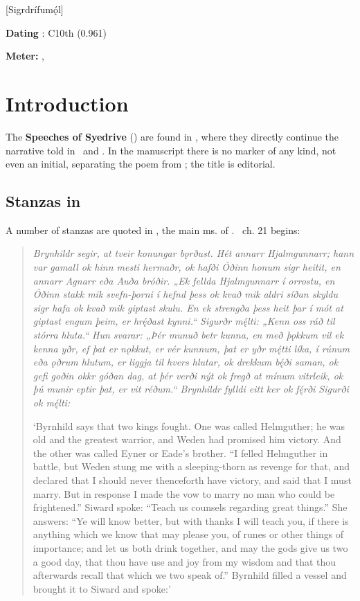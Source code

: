 [Sigrdrífumǫ́l]

\begin{flushright}%
\textbf{Dating} \parencite{Sapp2022}: C10th (0.961)

\textbf{Meter:} \Ljodahattr, \Fornyrdislag%
\end{flushright}

\section{Introduction}

The \textbf{Speeches of Syedrive} (\Sigrdrifumal) are found in \Regius, where they directly continue the narrative told in \Reginsmal\ and \Fafnismal.  In the manuscript there is no marker of any kind, not even an initial, separating the poem from \Fafnismal; the title is editorial.

\subsection{Stanzas in \VolsungaSaga}

A number of stanzas are quoted in \VolsungaMS, the main ms. of \VolsungaSaga.  \VolsungaSaga\ ch. 21 begins:

\begin{quote}
  \emph{Brynhildr segir, at tveir konungar bǫrðust. Hét annarr Hjalmgunnarr; hann var gamall ok hinn mesti hermaðr, ok hafði Óðinn honum sigr heitit, en annarr Agnarr eða Auða bróðir. „Ek fellda Hjalmgunnarr í orrostu, en Óðinn stakk mik svefn-þorni í hefnd þess ok kvað mik aldri síðan skyldu sigr hafa ok kvað mik giptast skulu. En ek strengða þess heit þar í mót at giptast engum þeim, er hrę́ðast kynni.“ Sigurðr mę́lti: „Kenn oss ráð til stórra hluta.“ Hun svarar: „Þér munuð betr kunna, en með þǫkkum vil ek kenna yðr, ef þat er nǫkkut, er vér kunnum, þat er yðr mę́tti líka, í rúnum eða ǫðrum hlutum, er liggja til hvers hlutar, ok drekkum bę́ði saman, ok gefi goðin okkr góðan dag, at þér verði nýt ok fregð at mínum vitrleik, ok þú munir eptir þat, er vit réðum.“ Brynhildr fylldi eitt ker ok fę́rði Sigurði ok mę́lti:}

  ‘Byrnhild says that two kings fought. One was called Helmguther; he was old and the greatest warrior, and Weden had promised him victory. And the other was called Eyner or Eade’s brother. “I felled Helmguther in battle, but Weden stung me with a sleeping-thorn as revenge for that, and declared that I should never thenceforth have victory, and said that I must marry. But in response I made the vow to marry no man who could be frightened.” Siward spoke: “Teach us counsels regarding great things.” She answers: “Ye will know better, but with thanks I will teach you, if there is anything which we know that may please you, of runes or other things of importance; and let us both drink together, and may the gods give us two a good day, that thou have use and joy from my wisdom and that thou afterwards recall that which we two speak of.” Byrnhild filled a vessel and brought it to Siward and spoke:’
\end{quote}

